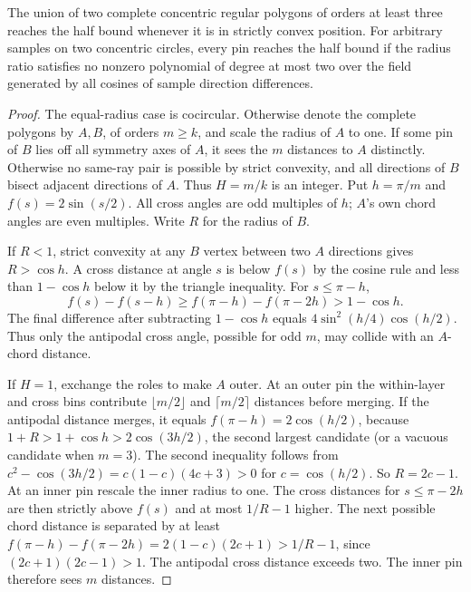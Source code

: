 \begin{proposition}[982-M03, 982-M04]
The union of two complete concentric regular polygons of orders at least
three reaches the half bound whenever it is in strictly convex position.
For arbitrary samples on two concentric circles, every pin reaches the
half bound if the radius ratio satisfies no nonzero polynomial of degree
at most two over the field generated by all cosines of sample direction differences.
\end{proposition}
\begin{proof}
The equal-radius case is cocircular. Otherwise denote the complete
polygons by \(A,B\), of orders \(m\ge k\), and scale the radius of \(A\) to
one. If some pin of \(B\) lies off all symmetry axes of \(A\), it sees the
\(m\) distances to \(A\) distinctly. Otherwise no same-ray pair is possible
by strict convexity, and all directions of \(B\) bisect adjacent directions
of \(A\). Thus \(H=m/k\) is an integer. Put \(h=\pi/m\) and \(f(s)=2\sin(s/2)\).
All cross angles are odd multiples of \(h\); \(A\)'s own chord angles
are even multiples. Write \(R\) for the radius of \(B\).

If \(R<1\), strict convexity at any \(B\) vertex between two \(A\) directions
gives \(R>\cos h\). A cross distance at angle \(s\) is below \(f(s)\)
by the cosine rule and less than \(1-\cos h\) below it by the triangle
inequality. For \(s\le\pi-h\),
\[
 f(s)-f(s-h)\ge f(\pi-h)-f(\pi-2h)>1-\cos h.
\]
The final difference after subtracting \(1-\cos h\) equals
\(4\sin^2(h/4)\cos(h/2)\). Thus only the antipodal cross angle, possible
for odd \(m\), may collide with an \(A\)-chord distance.

If \(H=1\), exchange the roles to make \(A\) outer. At an outer pin
the within-layer and cross bins contribute \(\lfloor m/2\rfloor\) and
\(\lceil m/2\rceil\) distances before merging. If the antipodal distance
merges, it equals \(f(\pi-h)=2\cos(h/2)\), because \(1+R>1+\cos h>
2\cos(3h/2)\), the second largest candidate (or a vacuous candidate
when \(m=3\)). The second inequality follows from
\(c^2-\cos(3h/2)=c(1-c)(4c+3)>0\) for \(c=\cos(h/2)\).
So \(R=2c-1\). At an inner pin rescale the inner radius to one.
The cross distances for \(s\le\pi-2h\) are then strictly above \(f(s)\)
and at most \(1/R-1\) higher. The next possible chord distance is separated
by at least \(f(\pi-h)-f(\pi-2h)=2(1-c)(2c+1)>1/R-1\), since
\((2c+1)(2c-1)>1\). The antipodal cross distance exceeds two.
The inner pin therefore sees \(m\) distances.


\end{proof}
